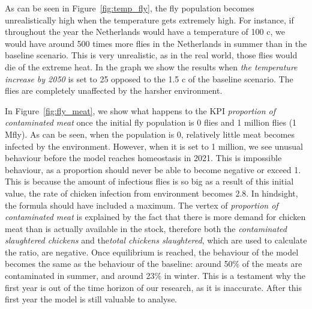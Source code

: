 As can be seen in Figure~\ref{fig:temp_fly}, the fly population becomes unrealistically high when the temperature gets extremely high. For instance, if throughout the year the Netherlands would have a temperature of 100 \degree c, we would have around 500 times more flies in the Netherlands in summer than in the baseline scenario. This is very unrealistic, as in the real world, those flies would die of the extreme heat. In the graph we show the results when \textit{the temperature increase by 2050} is set to 25 opposed to the 1.5 \degree c of the baseline scenario. The flies are completely unaffected by the harsher environment.

In Figure~\ref{fig:fly_meat}, we show what happens to the KPI \textit{proportion of contaminated meat} once the initial fly population is 0 flies and 1 million flies (1 Mfly). As can be seen, when the population is 0, relatively little meat becomes infected by the environment. However, when it is set to 1 million, we see unusual behaviour before the model reaches homeostasis in 2021. This is impossible behaviour, as a proportion should never be able to become negative or exceed 1. This is because the amount of infectious flies is so big as a result of this initial value, the rate of chicken infection from environment becomes 2.8. In hindsight, the formula should have included a maximum. The vertex of \textit{proportion of contaminated meat} is explained by the fact that there is more demand for chicken meat than is actually available in the stock, therefore both the \textit{contaminated slaughtered chickens} and the\textit{total chickens slaughtered}, which are used to calculate the ratio, are negative. Once equilibrium is reached, the behaviour of the model becomes the same as the behaviour of the baseline: around 50\% of the meats are contaminated in summer, and around 23\% in winter. This is a testament why the first year is out of the time horizon of our research, as it is inaccurate. After this first year the model is still valuable to analyse.

